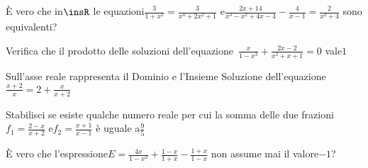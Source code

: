 \begin{esercizio}[\Ast]
 \label{ese:3.49}
È vero che in$\insR$ le equazioni$\frac{3}{1 + x^{2}} = \frac{3}{x^{4} + 2 
x^{2} + 1}$ e$\frac{2 x + 14}{x^{3}-x^{2} + 4 x-4}-\frac{4}{x-1} 
=\frac{2}{x^{2} + 4}$ sono equivalenti?
\end{esercizio}

\begin{esercizio}[\Ast]
 \label{ese:3.50}
Verifica che il prodotto delle soluzioni dell'equazione~$\frac{x}{1-x^{3}} + 
\frac{2 x-2}{x^{2} + x + 1}=0$ vale$1$
\end{esercizio}

\begin{esercizio}[\Ast]
 \label{ese:3.51}
Sull'asse reale rappresenta il Dominio e l'Insieme Soluzione dell'equazione 
$\frac{x + 2}{x}=2+\frac{x}{x + 2}$
\end{esercizio}

\begin{esercizio}[\Ast]
 \label{ese:3.52}
Stabilisci se esiste qualche numero reale per cui la somma delle due frazioni 
$f_{1}=\frac{2-x}{x + 2}$ e$f_{2}=\frac{x + 1}{x-1}$ è uguale a$\frac{9}{5}$
\end{esercizio}

\begin{esercizio}[\Ast]
 \label{ese:3.53}
È vero che l'espressione$E=\frac{4 x}{1-x^{2}} + \frac{1-x}{1 + x}-\frac{1 + 
x}{1-x}$ non assume mai il valore$-1$?
\end{esercizio}

